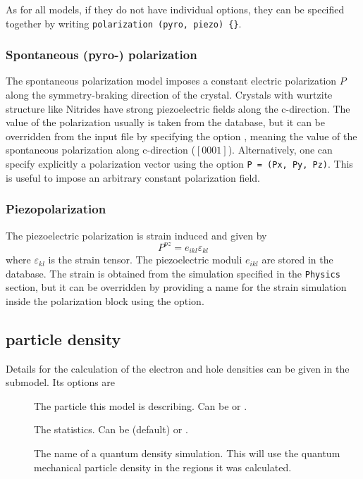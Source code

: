 As for all models, if they do not have individual options, they can be specified together by writing \verb+polarization (pyro, piezo) {}+.

\subsubsection{Spontaneous (pyro-) polarization}

The spontaneous polarization model imposes a constant electric polarization $P$ along the symmetry-braking direction of the crystal.
Crystals with wurtzite structure like Nitrides have strong piezoelectric fields along the c-direction.
The value of the polarization usually is taken from the database, but it can be overridden from the input file by specifying the option , meaning the value of the spontaneous polarization along c-direction ($[0001]$).
Alternatively, one can specify explicitly a polarization vector using the option \verb+P = (Px, Py, Pz)+.
This is useful to impose an arbitrary constant polarization field.

\subsubsection{Piezopolarization}
The piezoelectric polarization is strain induced and given by
\begin{equation}
P^{pz} = e_{ikl}\varepsilon_{kl}
\end{equation}
where $\varepsilon_{kl}$ is the strain tensor.
The piezoelectric moduli $e_{ikl}$ are stored in the database.
The strain is obtained from the simulation specified in the \texttt{Physics} section, but it can be overridden by providing a name
for the strain simulation inside the polarization block using the  option.


\subsection{particle density}
Details for the calculation of the electron and hole densities can be given in the  submodel.
Its options are
\begin{description}
\item[] The particle this model is describing. Can be  or . 
\item[] The statistics. Can be  (default) or . 
\item[] The name of a quantum density simulation. This will use the quantum mechanical particle density in the regions it was calculated.
\end{description}

